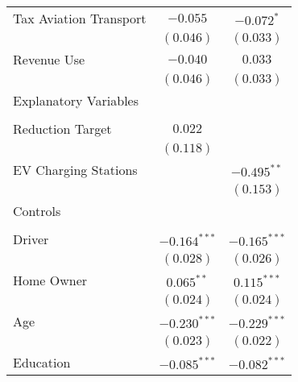 \begin{center}
\begin{tiny}
\begin{longtable}{l@{} c@{} c@{}}
\quad Tax Aviation Transport                             & $-0.055$         & $-0.072^{*}$     \\
                                                         & $(0.046)$        & $(0.033)$        \\
\quad Revenue Use                                        & $-0.040$         & $0.033$          \\
                                                         & $(0.046)$        & $(0.033)$        \\
Explanatory Variables                                    &                  &                  \\
                                                         &                  &                  \\
\quad Reduction Target                                   & $0.022$          &                  \\
                                                         & $(0.118)$        &                  \\
\quad EV Charging Stations                               &                  & $-0.495^{**}$    \\
                                                         &                  & $(0.153)$        \\
Controls                                                 &                  &                  \\
                                                         &                  &                  \\
\quad Driver                                             & $-0.164^{***}$   & $-0.165^{***}$   \\
                                                         & $(0.028)$        & $(0.026)$        \\
\quad Home Owner                                         & $0.065^{**}$     & $0.115^{***}$    \\
                                                         & $(0.024)$        & $(0.024)$        \\
\quad Age                                                & $-0.230^{***}$   & $-0.229^{***}$   \\
                                                         & $(0.023)$        & $(0.022)$        \\
\quad Education                                          & $-0.085^{***}$   & $-0.082^{***}$   \\

\end{longtable}
\end{tiny}
\end{center}
